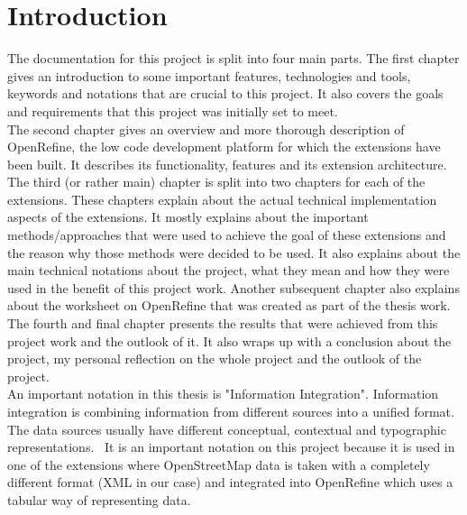 \chapter{Introduction}\label{ch:introduction}
The documentation for this project is split into four main parts.
The first chapter gives an introduction to some important features, technologies and tools, keywords and notations that are crucial to this project.
It also covers the goals and requirements that this project was initially set to meet.\\
\newline
The second chapter gives an overview and more thorough description of OpenRefine,
the low code development platform for which the extensions have been built.
It describes its functionality, features and its extension architecture. \\
\newline
The third (or rather main) chapter is split into two chapters for each of the extensions.
These chapters explain about the actual technical implementation aspects of the extensions.
It mostly explains about the important methods/approaches that were used to achieve the goal of these extensions and the reason why those methods were decided to be used.
It also explains about the main technical notations about the project, what they mean and how they were used in the benefit of this project work. Another subsequent chapter also explains about the worksheet on OpenRefine that was created as part of the thesis work.\\
\newline
The fourth and final chapter presents the results that were achieved from this project work and the outlook of it.
It also wraps up with a conclusion about the project, my personal reflection on the whole project and the outlook of the project.\\
\newline
An important notation in this thesis is "Information Integration". Information integration is combining information from different sources into a unified format. The data sources usually have different conceptual, contextual and typographic representations.~\cite{InformationIntegration} It is an important notation on this project because it is used in one of the extensions where OpenStreetMap data is taken with a completely different format (XML in our case) and integrated into OpenRefine which uses a tabular way of representing data.
\pagebreak
